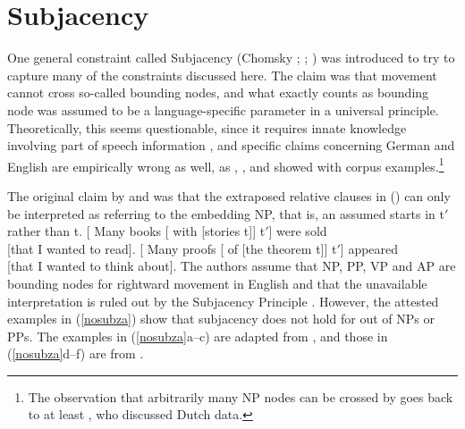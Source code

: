 \documentclass[output=paper
 	        ,biblatex
                ,babelshorthands
                ,newtxmath
                ,draftmode
                ,colorlinks, citecolor=brown
]{langscibook}
\begin{document}
\section{Subjacency}

One general constraint called Subjacency (Chomsky \citeyear[]{Chomsky73a}; \citeyear[]{Chomsky86b};
\citealp{Baltin81a,Baltin2006a}) was introduced to try to capture many of the constraints discussed here.
The claim was that movement cannot cross so-called bounding nodes, and what exactly counts as bounding
node was assumed to be a language-specific parameter in a universal principle. Theoretically, this
seems questionable, since it requires innate knowledge involving part of speech information
\parencites[Section~13.1.5.1]{MuellerGT-Eng4}[--540]{Newmeyer2004a}, and specific claims
concerning German and English are empirically wrong as well, as \citet{Mueller2004d},
\citet{Mueller2007c}, \citet{MM2009a} and \citet{SS2013b-u} showed with corpus examples.\footnote{
  The observation that arbitrarily many NP nodes can be crossed by  goes back
  to at least \citet[]{Koster78b-u}, who discussed Dutch data.
}

The original claim by \citet{Baltin81a} and \citet[]{Chomsky86b} was that the extraposed
relative clauses in () can only be interpreted as referring to the embedding NP, that is, an
assumed  starts in t$'$ rather than t.
\eal
\label{ex-chomsky-sub}
\ex {}[ Many books [ with [stories t]] t$'$]  were sold\\
    {}[that I wanted to read].
\ex {}[ Many proofs [ of [the theorem t]] t$'$] appeared\\
    {}[that I wanted to think about].
\zl
The authors assume that NP, PP, VP and AP are bounding nodes for rightward movement in English and
that the unavailable interpretation is ruled out by the Subjacency Principle \citep[]{Baltin81a}. However, the attested examples in (\ref{nosubza}) show that subjacency does not
hold for  out of NPs or PPs. The examples in (\ref{nosubza}a--c) are adapted from
\citet[, 109, 111]{SS2013b-u}, and those in (\ref{nosubza}d--f) are from \citet[863]{chavesrnr}.
\eal \label{nosubza}

\end{document}
